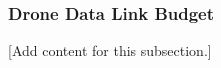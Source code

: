 
\subsubsection{Drone Data Link Budget}
\label{subsubsec:design_6_3_drone_data_link_budget}

[Add content for this subsection.]
